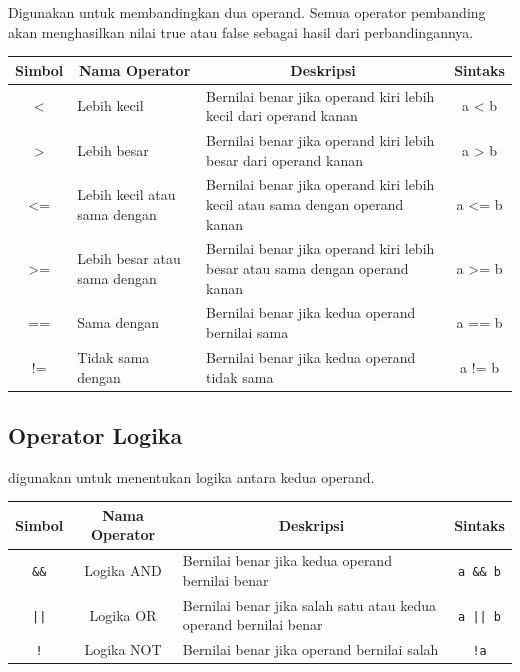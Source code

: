 Digunakan untuk membandingkan dua operand.
Semua operator pembanding akan menghasilkan nilai true atau false sebagai hasil dari perbandingannya.
\begin{center}
	\begin{tabular}{|c|p{3cm}|p{6cm}|c|}
		\hline
		\multicolumn{1}{|c|}{\textbf{Simbol}} &
		\multicolumn{1}{c|}{\textbf{Nama Operator}} &
		\multicolumn{1}{c|}{\textbf{Deskripsi}} &
		\multicolumn{1}{c|}{\textbf{Sintaks}} \\ \hline
		<   & Lebih kecil                & Bernilai benar jika operand kiri lebih kecil dari operand kanan & a < b \\ \hline
		>   & Lebih besar                & Bernilai benar jika operand kiri lebih besar dari operand kanan & a > b \\ \hline
		<=  & Lebih kecil atau sama dengan & Bernilai benar jika operand kiri lebih kecil atau sama dengan operand kanan & a <= b \\ \hline
		>=  & Lebih besar atau sama dengan & Bernilai benar jika operand kiri lebih besar atau sama dengan operand kanan & a >= b \\ \hline
		==  & Sama dengan                & Bernilai benar jika kedua operand bernilai sama & a == b \\ \hline
		!=  & Tidak sama dengan          & Bernilai benar jika kedua operand tidak sama & a != b \\ \hline
	\end{tabular}
\end{center}

\subsection{Operator Logika}

digunakan untuk menentukan logika antara kedua operand.
\begin{center}
	\begin{tabular}{|c|c|p{7cm}|c|}
		\hline
		\multicolumn{1}{|c|}{\textbf{Simbol}} &
		\multicolumn{1}{c|}{\textbf{Nama Operator}} &
		\multicolumn{1}{c|}{\textbf{Deskripsi}} &
		\multicolumn{1}{c|}{\textbf{Sintaks}} \\ \hline
		\texttt{\&\&} & Logika AND & Bernilai benar jika kedua operand bernilai benar & \texttt{a \&\& b} \\ \hline
		\texttt{||}   & Logika OR  & Bernilai benar jika salah satu atau kedua operand bernilai benar & \texttt{a || b} \\ \hline
		\texttt{!}    & Logika NOT & Bernilai benar jika operand bernilai salah & \texttt{!a} \\ \hline
	\end{tabular}
\end{center}

